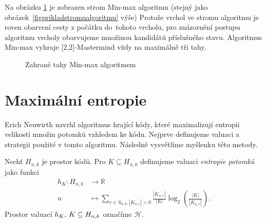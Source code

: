 Na obrázku \ref{fig22minmax} je zobrazen strom Min-max algoritmu (stejný jako obrázek~\ref{figprikladstromualgoritmu} výše) Protože vrchol ve stromu algoritmu je roven obarvení cesty z počátku do~tohoto vrcholu, pro znázornění postupu algoritmu vrcholy obarvujeme množinou kandidátů příslušného stavu. Algoritmus Min-max vyhraje [2,2]-Mastermind vždy na maximálně tři tahy. 
\begin{figure}[h!]
    \centering
    \caption{Zahrané tahy Min-max algoritmem}
\label{fig22minmax}
\end{figure}



\section{Maximální entropie}
Erich Neuwirth \cite{neuwirth} navrhl algoritmus hrající kódy, které maximalizují entropii velikostí množin potomků vzhledem ke kódu. Nejprve definujeme valuaci a strategii použité v tomto algoritmu. Následně vysvětlíme myšlenku této metody.

\begin{definice}\label{defentropierozdeleni}
    Nechť $H_{n,k}$ je prostor kódů. Pro $K \subseteq H_{n,k}$ definujeme valuaci \emph{entropie potomků} jako funkci
    \begin{align*}
        h_K \colon H_{n,k} &\to \mathbb{R} \\
        u &\mapsto \sum_{r\in S_{n,k}, |K_{u,r}| > 0} \frac{|K_{u,r}|}{|K|}\log_2\left( \frac{|K|}{|K_{u,r}|} \right).
    \end{align*}
    Prostor valuací $h_K, \hspace{2px} K \subseteq H_{n,k}$ označíme $\mathcal{H}$. 
\end{definice}


